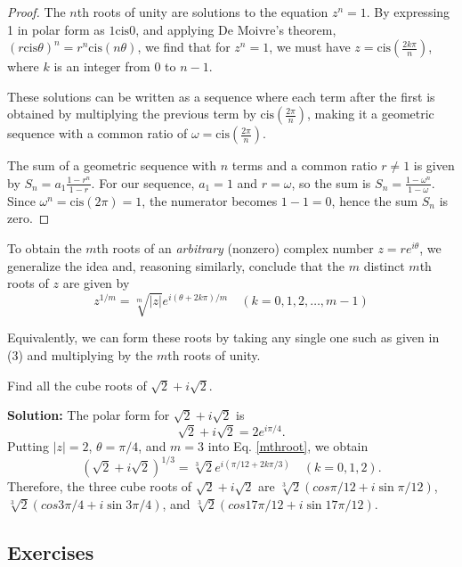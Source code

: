 \begin{proof}
    The \( n \)th roots of unity are solutions to the equation \( z^n = 1 \). By expressing 1 in polar form as \( 1 \text{cis} 0 \), and applying De Moivre's theorem, \( (r \text{cis} \theta)^n = r^n \text{cis} (n\theta) \), we find that for \( z^n = 1 \), we must have \( z = \text{cis} \left(\frac{2k\pi}{n}\right) \), where \( k \) is an integer from \( 0 \) to \( n-1 \).

These solutions can be written as a sequence where each term after the first is obtained by multiplying the previous term by \( \text{cis} \left(\frac{2\pi}{n}\right) \), making it a geometric sequence with a common ratio of \( \omega = \text{cis} \left(\frac{2\pi}{n}\right) \).

The sum of a geometric sequence with \( n \) terms and a common ratio \( r \neq 1 \) is given by \( S_n = a_1 \frac{1-r^n}{1-r} \). For our sequence, \( a_1 = 1 \) and \( r = \omega \), so the sum is \( S_n = \frac{1-\omega^n}{1-\omega} \). Since \( \omega^n = \text{cis} (2\pi) = 1 \), the numerator becomes \( 1-1 = 0 \), hence the sum \( S_n \) is zero.
\end{proof}

To obtain the \( m \)th roots of an \textit{arbitrary} (nonzero) complex number \( z = re^{i\theta} \), we generalize the idea and, reasoning similarly, conclude that the \( m \) distinct \( m \)th roots of \( z \) are given by
\begin{equation}\label{mthroot}
    \boxed{z^{1/m} = \sqrt[m]{|z|}e^{i(\theta+2k\pi)/m} \quad (k = 0, 1, 2, \ldots, m - 1)}
\end{equation}

Equivalently, we can form these roots by taking any single one such as given in (3) and multiplying by the \( m \)th roots of unity.

\begin{example}
    Find all the cube roots of \( \sqrt{2} + i\sqrt{2} \).
\end{example}
\textbf{Solution:}
The polar form for \( \sqrt{2} + i\sqrt{2} \) is
\[
\sqrt{2} + i\sqrt{2} = 2e^{i\pi/4}.
\]
Putting \( |z| = 2 \), \( \theta = \pi/4 \), and \( m = 3 \) into Eq. \ref{mthroot}, we obtain
\[
(\sqrt{2} + i\sqrt{2})^{1/3} = \sqrt[3]{2}e^{i(\pi/12+2k\pi/3)} \quad (k = 0, 1, 2).
\]
Therefore, the three cube roots of \( \sqrt{2} + i\sqrt{2} \) are \( \sqrt[3]{2}(cos \pi/12 + i \sin \pi/12) \), \( \sqrt[3]{2}(cos 3\pi/4 + i \sin 3\pi/4) \), and \( \sqrt[3]{2}(cos 17\pi/12 + i \sin 17\pi/12) \).
\subsection{Exercises}

